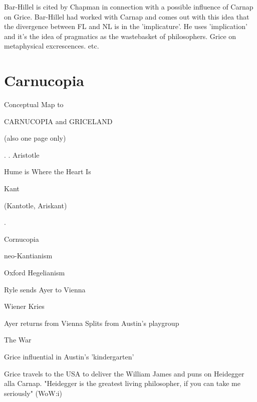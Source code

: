 \documentclass[10pt,titlepage]{book}
\begin{document}
{Bar-Hillel  is cited by Chapman in connection with a 
possible influence of Carnap on Grice.  Bar-Hillel had worked with Carnap
and comes out with this idea that the  divergence between FL and NL is in the 
'implicature'. He uses 'implication' and  it's the idea of pragmatics as 
the wastebasket of philosophers. Grice on  metaphysical excrescences. etc.  

\section{Carnucopia}
Conceptual  
 Map
                     to
 
CARNUCOPIA and   GRICELAND
 
      (also one page only)
 
 
                       .
                       .
               Aristotle
 
 
          Hume is Where the  Heart Is
 
                  Kant
 
             (Kantotle, Ariskant)
 
 
                   .
 
Cornucopia
 
neo-Kantianism
 
                                  Oxford Hegelianism
 
                                           Ryle sends Ayer to 
                                               Vienna
 
 Wiener Kries
 
 
                                     Ayer returns from Vienna
                              Splits from Austin's playgroup
 
                     The War
 
                                     Grice influential
                                      in Austin's 'kindergarten'
 
                          
                                      Grice  travels to the USA
                                       to deliver the William James
                                       and puns on Heidegger alla
                                       Carnap.
                                    "Heidegger is the greatest living
                                     philosopher, if you can take
                                     me seriously" (WoW:i)
 
}
\end{document}
